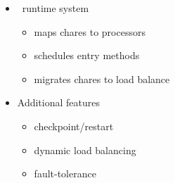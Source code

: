 \begin{frame}[fragile]
\begin{minipage}[t]{2.50in}
\begin{itemize}
\begin{itemize}
  \end{itemize}
\ \\ \pause
\item \charm\ runtime system
  \begin{itemize}
  \item maps chares to processors
  \item schedules entry methods
  \item migrates chares to load balance
  \end{itemize} \pause
\item Additional features
\begin{itemize}
\item checkpoint/restart
\item dynamic load balancing
\item fault-tolerance
\end{itemize}
\end{itemize}
\end{minipage}
\end{frame}
